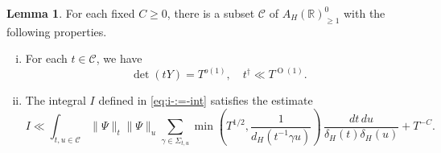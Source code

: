 \documentclass[reqno]{amsart}
\def\O{\operatorname{O}}
\theoremstyle{plain} \newtheorem{theorem} {Theorem}
\theoremstyle{definition} \newtheorem{definition} [theorem] {Definition}
\theoremstyle{itplain} %
\newtheorem{lemma}[theorem]{Lemma}
\numberwithin{equation}{section}
\numberwithin{theorem}{section}
\renewcommand{\geq}{\geqslant}
\begin{document}
\begin{lemma}\label{lem:standard2:each-fixed-c}
  For each fixed $C \geq 0$, there is a subset $\mathcal{C}$ of $A_H(\mathbb{R})^0_{\geq 1}$ with the following properties.
  \begin{enumerate}[(i)]
  \item For each $t \in \mathcal{C}$, we have
    \begin{equation}\label{eq:detr-=-dety}
      \det(t Y)  = T^{o(1)}, \quad t ^\dagger \ll T^{\O(1)}.
    \end{equation}
  \item The integral $I$ defined in \eqref{eq:i-:=-int} satisfies the estimate
    \begin{equation}\label{eq:mathcale-ll-tn2-restricted-to-C}
      I \ll
      \int _{t, u  \in \mathcal{C} }
      \|\Psi\|_{t}
      \|\Psi\|_{u}
      \sum _{\gamma \in \Sigma_{t,u}}
      \min \left( T^{1/2}, \frac{1}{d_H(t^{-1} \gamma u)} \right)
      \, \frac{d t \, d u}{\delta_H(t) \delta_H(u)}
      + T^{-C}.
    \end{equation}
  \end{enumerate}
\end{lemma}
\end{document}
